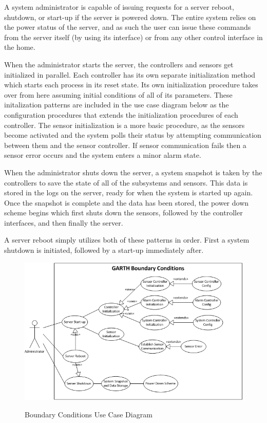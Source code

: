 \documentclass{report}
\begin{document}
A system administrator is capable of issuing requests for a server reboot, 
shutdown, or start-up if the server is powered down. The entire system relies 
on the power status of the server, and as such the user can issue these commands
from the server itself (by using its interface) or from any other control interface
in the home.

When the administrator starts the server, the controllers and sensors get
initialized in parallel. Each controller has its own separate initialization
method which starts each process in its reset state. Its own initialization
procedure takes over from here assuming initial conditions of all of its
parameters. These initalization patterns are included in the use case diagram
below as the configuration procedures that extends the initialization procedures
of each controller. The sensor initialization is a more basic procedure, as the
sensors become activated and the system polls their status by attempting 
communication between them and the sensor controller. If sensor communication
fails then a sensor error occurs and the system enters a minor alarm state.

When the administrator shuts down the server, a system snapshot is taken by
the controllers to save the state of all of the subsystems and sensors. This 
data is stored in the logs on the server, ready for when the system is started
up again. Once the snapshot is complete and the data has been stored, the power
down scheme begins which first shuts down the sensors, followed by the 
controller interfaces, and then finally the server.

A server reboot simply utilizes both of these patterns in order. First a system
shutdown is initiated, followed by a start-up immediately after.


\begin{figure}[hp]
    \centering
        \caption{Boundary Conditions Use Case Diagram}
        \scriptsize
        \setlength{\unitlength}{2.0em}
        \includegraphics{boundary_conditions.png}
        \normalsize
    \label{fig:boundary_conditions}
\end{figure}
\end{document}

